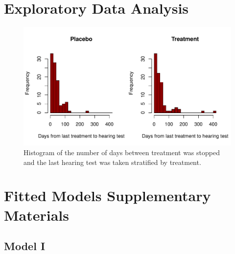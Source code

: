\documentclass[paper=a4, fontsize=11pt]{scrartcl} %
\numberwithin{equation}{section} %
\numberwithin{figure}{section} %
\numberwithin{table}{section} %
\begin{document}
\section{Exploratory Data Analysis}
\begin{figure}[H]
\centering
\includegraphics[width=.8\textwidth]{./rcode/plots/days_since_trt_stop}
\caption{Histogram of the number of days between treatment was stopped and the last hearing test was taken stratified by treatment.}
\label{fig:days_since_last_trt}
\end{figure}


\section{Fitted Models Supplementary Materials}
\subsection{Model I}
\label{sec:model_i_app}
\end{document}
